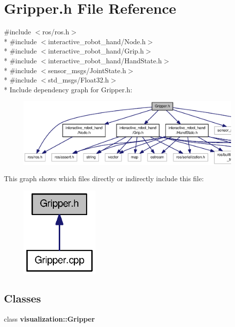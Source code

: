 \section{Gripper.\-h File Reference}
\label{Gripper_8h}
{\ttfamily \#include $<$ros/ros.\-h$>$}\\*
{\ttfamily \#include $<$interactive\-\_\-robot\-\_\-hand/\-Node.\-h$>$}\\*
{\ttfamily \#include $<$interactive\-\_\-robot\-\_\-hand/\-Grip.\-h$>$}\\*
{\ttfamily \#include $<$interactive\-\_\-robot\-\_\-hand/\-Hand\-State.\-h$>$}\\*
{\ttfamily \#include $<$sensor\-\_\-msgs/\-Joint\-State.\-h$>$}\\*
{\ttfamily \#include $<$std\-\_\-msgs/\-Float32.\-h$>$}\\*
Include dependency graph for Gripper.\-h\-:
\nopagebreak
\begin{figure}[H]
\begin{center}
\leavevmode
\includegraphics[width=350pt]{Gripper_8h__incl}
\end{center}
\end{figure}
This graph shows which files directly or indirectly include this file\-:
\nopagebreak
\begin{figure}[H]
\begin{center}
\leavevmode
\includegraphics[width=110pt]{Gripper_8h__dep__incl}
\end{center}
\end{figure}
\subsection*{Classes}
\begin{DoxyCompactItemize}
\item 
class {\bf visualization\-::\-Gripper}
\end{DoxyCompactItemize}
